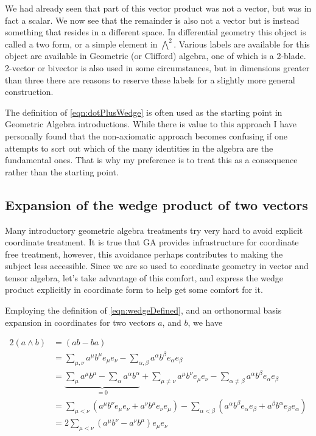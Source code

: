 We had already seen that part of this vector product was not a vector, but was in fact a scalar.  We now see that the remainder is also not a vector but is instead something that resides in a different space.  In differential geometry this object is called a two form, or a simple element in $\bigwedge^2$.  Various labels are available for this object are available in Geometric (or Clifford) algebra, one of which is a 2-blade.  2-vector or bivector is also used in some circumstances, but in dimensions greater than three there are reasons to reserve these labels for a slightly more general construction.

The definition of \ref{eqn:dotPlusWedge} is often used as the starting point in Geometric Algebra introductions.  While there is value to this approach I have personally found that the non-axiomatic approach becomes confusing if one attempts to sort out which of the many identities in the algebra are the fundamental ones.  That is why my preference is to treat this as a consequence rather than the starting point.

\subsection{ Expansion of the wedge product of two vectors }

Many introductory geometric algebra treatments try very hard to avoid explicit coordinate treatment.  It is true that GA provides infrastructure for coordinate free treatment, however, this avoidance perhaps contributes to making the subject less accessible.  Since we are so used to coordinate geometry in vector and tensor algebra, let's take advantage of this comfort, and express the wedge product explicitly in coordinate form to help get some comfort for it.

Employing the definition of \ref{eqn:wedgeDefined}, and an orthonormal basis
expansion in 
coordinates for two vectors $a$, and $b$, we have

\begin{align*}
2 (a \wedge b)
&= ( a b - b a ) \\
&= 
\sum_{\mu,\nu} a^\mu b^\mu e_\mu e_\nu 
-\sum_{\alpha,\beta} a^\alpha b^\beta e_\alpha e_\beta \\
&= 
\underbrace{\sum_{\mu} a^\mu b^\mu 
- \sum_{\alpha} a^\alpha b^\alpha }_{=0}
+ \sum_{\mu \ne \nu} a^\mu b^\nu e_\mu e_\nu 
- \sum_{\alpha \ne \beta} a^\alpha b^\beta e_\alpha e_\beta \\
&=
\sum_{\mu < \nu} (a^\mu b^\nu e_\mu e_\nu + a^\nu b^\mu e_\nu e_\mu)
- \sum_{\alpha < \beta} (a^\alpha b^\beta e_\alpha e_\beta + a^\beta b^\alpha e_\beta e_\alpha )
\\
&=
2 \sum_{\mu < \nu} ( a^\mu b^\nu - a^\nu b^\mu ) e_\mu e_\nu 
\end{align*}

